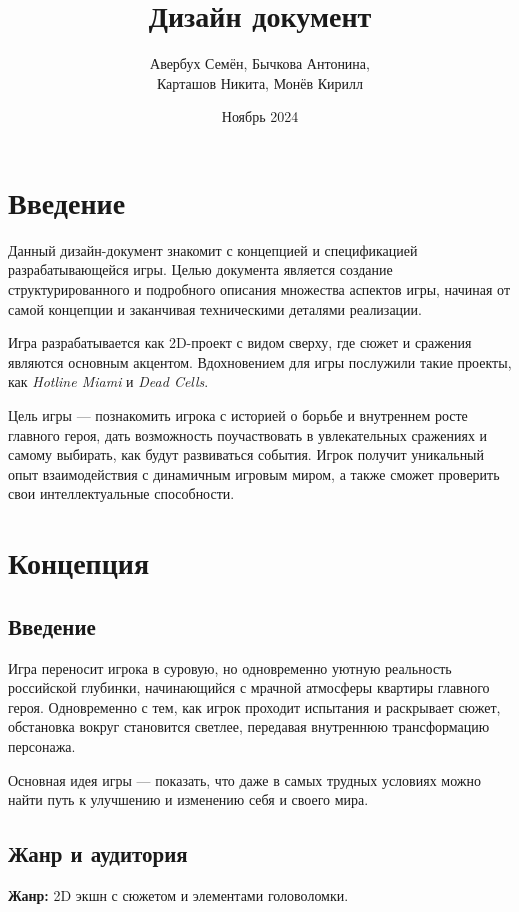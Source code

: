 \documentclass[12pt]{article}
\title{Дизайн документ}
\author{Авербух Семён, Бычкова Антонина, \\ Карташов Никита, Монёв Кирилл}
\date{Ноябрь 2024}
\begin{document}
\maketitle

\begingroup
\footnotesize
\tableofcontents
\endgroup

\section{Введение}
Данный дизайн-документ знакомит с концепцией и спецификацией разрабатывающейся игры. Целью документа является создание структурированного и подробного описания множества аспектов игры, начиная от самой концепции и заканчивая техническими деталями реализации.

Игра разрабатывается как 2D-проект с видом сверху, где сюжет и сражения являются основным акцентом. Вдохновением для игры послужили такие проекты, как \textit{Hotline Miami} и \textit{Dead Cells}.

Цель игры — познакомить игрока с историей о борьбе и внутреннем росте главного героя, дать возможность поучаствовать в увлекательных сражениях и самому выбирать, как будут развиваться события. Игрок получит уникальный опыт взаимодействия с динамичным игровым миром, а также сможет проверить свои интеллектуальные способности.

\section{Концепция}
    \subsection{Введение}
Игра переносит игрока в суровую, но одновременно уютную реальность российской глубинки, начинающийся с мрачной атмосферы квартиры главного героя. Одновременно с тем, как игрок проходит испытания и раскрывает сюжет, обстановка вокруг становится светлее, передавая внутреннюю трансформацию персонажа.

Основная идея игры — показать, что даже в самых трудных условиях можно найти путь к улучшению и изменению себя и своего мира.
    \subsection{Жанр и аудитория}
    \textbf{Жанр:} 2D экшн с сюжетом и элементами головоломки.
\end{document}
